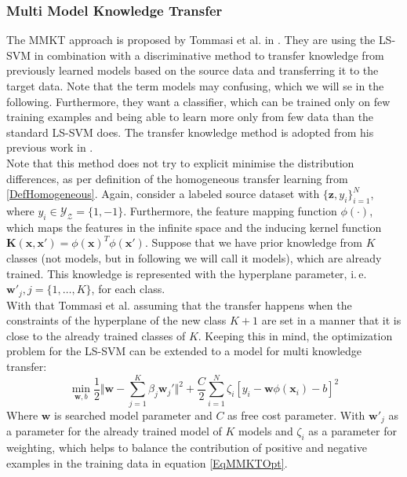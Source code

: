 \subsubsection{Multi Model Knowledge Transfer}
The \acs{MMKT} approach is proposed by Tommasi et al. in \cite{Tommasi.}.
They are using the \ac{LS-SVM} in combination with a discriminative method to transfer knowledge from previously learned models based on the source data and transferring it to the target data.
Note that the term models may confusing, which we will se in the following.
Furthermore, they want a classifier, which can be trained only on few training examples and being able to learn more only from few data than the standard \acs{LS-SVM} does.
The transfer knowledge method is adopted from his previous work in \cite{Tommasi.2009}.\\
Note that this method does not try to explicit minimise the distribution differences, as per definition of the homogeneous transfer learning from \ref{DefHomogeneous}.
Again, consider a labeled source dataset with $\{\mathbf{z},{y_i}\}_{i=1}^{N}$, where $y_i \in \mathcal{Y_Z} =\{1,-1\}$.
Furthermore, the feature mapping function $\phi(\cdot)$, which maps the features in the infinite space and the inducing kernel function $\mathbf{K}(\mathbf{x},\mathbf{x}')=\phi(\mathbf{x})^T\phi(\mathbf{x}')$.
Suppose that we have prior knowledge from $K$ classes (not models, but in following we will call it models), which are already trained.
This knowledge is represented with the hyperplane parameter, i.\,e. $\mathbf{w}'_j, j = \{1,\dots,K\}$, for each class.\cite{Tommasi.}\\
With that Tommasi et al. assuming that the transfer happens when the constraints of the hyperplane of the new class $K+1$ are set in a manner that it is close to the already trained classes of $K$.
Keeping this in mind, the optimization problem for the \acs{LS-SVM} can be extended to a model for multi knowledge transfer:\cite{Tommasi.}
\begin{equation}\label{EqMMKTOpt}
		\min_{\mathbf{w},b} \frac{1}{2}\Vert\mathbf{w}-\sum_{j=1}^{K}\beta_j\mathbf{w}_j'\Vert^2 + \frac{C}{2}\sum_{i=1}^{N}\zeta_i[y_i-\mathbf{w}\phi(\mathbf{x}_i)-b]^2
\end{equation}
Where $\mathbf{w}$ is searched model parameter and $C$ as free cost parameter. With $\mathbf{w}'_j$ as a parameter for the already trained model of $K$ models and $\zeta_i$ as a parameter for weighting, which helps to balance the contribution of positive and negative examples in the training data in equation \eqref{EqMMKTOpt}.
